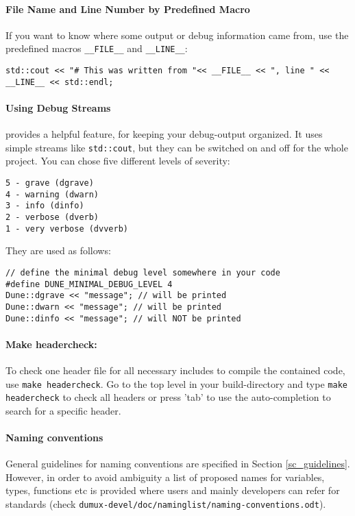 \paragraph{File Name and Line Number by Predefined Macro}
If you want to  know where some output or debug information came from, use the predefined
macros \texttt{\_\_FILE\_\_} and \texttt{\_\_LINE\_\_}:
\begin{lstlisting}[style=DumuxCode]
std::cout << "# This was written from "<< __FILE__ << ", line " << __LINE__ << std::endl;
\end{lstlisting}

\paragraph{Using \Dune Debug Streams}
\Dune provides a helpful feature, for keeping your debug-output organized.
It uses simple streams like \texttt{std::cout}, but they can be switched on and off
for the whole project. You can chose five different levels of severity:
\begin{verbatim}
5 - grave (dgrave)
4 - warning (dwarn)
3 - info (dinfo)
2 - verbose (dverb)
1 - very verbose (dvverb)
\end{verbatim}
\noindent They are used as follows:
\begin{lstlisting}[style=DumuxCode]
// define the minimal debug level somewhere in your code
#define DUNE_MINIMAL_DEBUG_LEVEL 4
Dune::dgrave << "message"; // will be printed
Dune::dwarn << "message"; // will be printed
Dune::dinfo << "message"; // will NOT be printed
\end{lstlisting}

\paragraph{Make headercheck:}
To check one header file for all necessary includes to compile the contained
code, use \texttt{make headercheck}. Go to the top level in your build-directory
and type \texttt{make headercheck} to check all headers or press 'tab' to use the
auto-completion to search for a specific header.

\paragraph{Naming conventions}
General guidelines for naming conventions are specified in Section \ref{sc_guidelines}.
However, in order to avoid ambiguity a list of proposed names for variables, types,
functions etc is provided where users and mainly \Dumux developers can refer for
standards (check \texttt{dumux-devel/\allowbreak doc/\allowbreak naminglist/\allowbreak naming-conventions.odt}).
